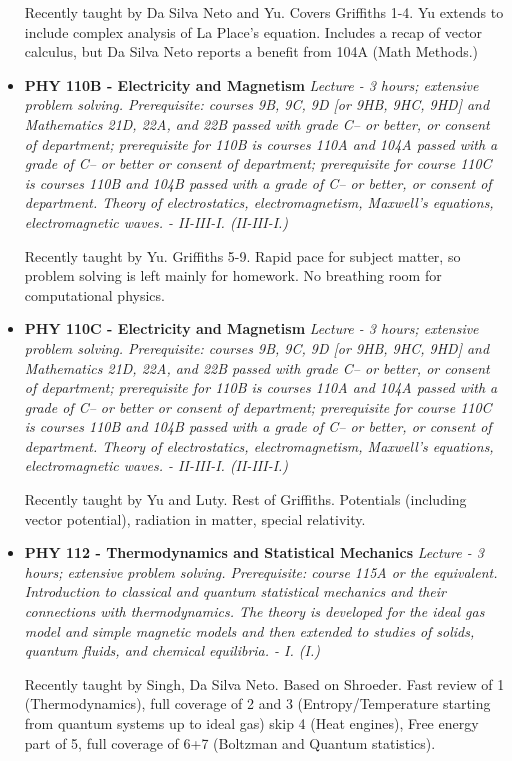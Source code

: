 \documentclass[12pt]{article}
\begin{document}
\begin{itemize}
Recently taught by Da Silva Neto and Yu.  Covers Griffiths 1-4.  Yu extends to include complex analysis of La Place's equation.  Includes a recap of vector calculus, but Da Silva Neto reports a benefit from 104A  (Math Methods.)

\item {\bf PHY 110B - Electricity and Magnetism}
{\it Lecture - 3 hours; extensive problem solving. Prerequisite: courses 9B, 9C, 9D [or 9HB, 9HC, 9HD] and Mathematics 21D, 22A, and 22B passed with grade C– or better, or consent of department; prerequisite for 110B is courses 110A and 104A passed with a grade of C– or better or consent of department; prerequisite for course 110C is courses 110B and 104B passed with a grade of C– or better, or consent of department. Theory of electrostatics, electromagnetism, Maxwell’s equations, electromagnetic waves. - II-III-I. (II-III-I.)}

Recently taught by Yu.  Griffiths 5-9.  Rapid pace for subject matter, so problem solving is left mainly for homework.  No breathing room for computational physics.

\item {\bf PHY 110C - Electricity and Magnetism}
{\it Lecture - 3 hours; extensive problem solving. Prerequisite: courses 9B, 9C, 9D [or 9HB, 9HC, 9HD] and Mathematics 21D, 22A, and 22B passed with grade C– or better, or consent of department; prerequisite for 110B is courses 110A and 104A passed with a grade of C– or better or consent of department; prerequisite for course 110C is courses 110B and 104B passed with a grade of C– or better, or consent of department. Theory of electrostatics, electromagnetism, Maxwell’s equations, electromagnetic waves. - II-III-I. (II-III-I.)}

Recently taught by Yu and Luty.  Rest of Griffiths.   Potentials (including vector potential), radiation in matter, special relativity.

\item {\bf PHY 112 - Thermodynamics and Statistical Mechanics}
{\it Lecture - 3 hours; extensive problem solving. Prerequisite: course 115A or the equivalent. Introduction to classical and quantum statistical mechanics and their connections with thermodynamics. The theory is developed for the ideal gas model and simple magnetic models and then extended to studies of solids, quantum fluids, and chemical equilibria. - I. (I.)}

Recently taught by Singh, Da Silva Neto.  Based on Shroeder.  
Fast review of 1 (Thermodynamics), full coverage of 2 and 3 (Entropy/Temperature starting from quantum systems up to ideal gas) skip 4 (Heat engines), Free energy part of 5, full coverage of 6+7 (Boltzman and Quantum statistics).


\end{itemize}
\end{document}
